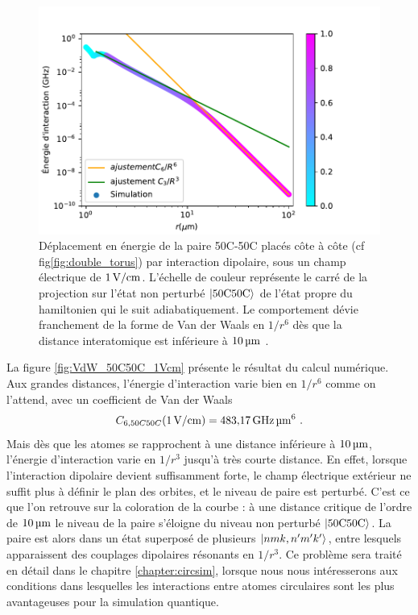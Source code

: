 \begin{figure}[!h]
\centering
\includegraphics[width=1\linewidth]{figures/theory/VdW_50C50C_1Vcm}
\caption[Interaction dipolaire 50C-50C]{Déplacement en énergie de la paire 50C-50C placés côte à côte (cf fig\eqref{fig:double_torus}) par interaction dipolaire, sous un champ électrique de $\SIvv{1}{\V / \cm}$. L'échelle de couleur représente le carré de la projection sur l'état non perturbé $\ket{50\text{C} 50\text{C}}$ de l'état propre du hamiltonien qui le suit adiabatiquement.
Le comportement dévie franchement de la forme de Van der Waals en $1/r^6$ dès que la distance interatomique est inférieure à $\SIv{10}{\micro\meter}$.
}
\label{fig:VdW_50C50C_1Vcm}
\end{figure}

La figure \eqref{fig:VdW_50C50C_1Vcm} présente le résultat du calcul numérique.
Aux grandes distances, l'énergie d'interaction varie bien en $1/r^6$ comme on l'attend, avec un coefficient de Van der Waals 
\begin{equation}
\label{eq:C6_50C50C}
C_{6,50C50C}(\SIvv{1}{V/cm}) = \SIv{483.17}{\GHz\raiseto{6}\um}.
\end{equation}
Mais dès que les atomes se rapprochent à une distance inférieure à $\SIvv{10}{\um}$, l'énergie d'interaction varie en $1/r^3$ jusqu'à très courte distance.
En effet, lorsque l'interaction dipolaire devient suffisamment forte, le champ électrique extérieur ne suffit plus à définir le plan des orbites, et le niveau de paire est perturbé.
C'est ce que l'on retrouve sur la coloration de la courbe : à une distance critique de l'ordre de $\SIvv{10}{\um}$ le niveau de la paire s'éloigne du niveau non perturbé $\ket{\mathrm{50C50C}}$.
La paire est alors dans un état superposé de plusieurs $\ket{nmk,n'm'k'}$, entre lesquels apparaissent des couplages dipolaires résonants en $1/r^3$.
Ce problème sera traité en détail dans le chapitre \ref{chapter:circsim}, lorsque nous nous intéresserons aux conditions dans lesquelles les interactions entre atomes circulaires sont les plus avantageuses pour la simulation quantique.

